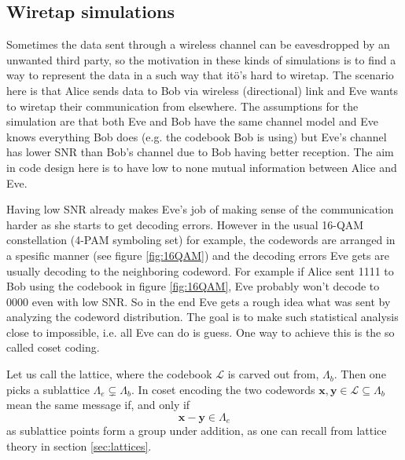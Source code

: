 \documentclass[english,12pt,a4paper,pdftex,sci,utf8]{aaltothesis}
\begin{document}
\subsection{Wiretap simulations}
\label{sec:wiretap}
Sometimes the data sent through a wireless channel can be eavesdropped by an unwanted third party, so the motivation in these kinds of simulations is to find a way to represent the data in a such way that itö's hard to wiretap. The scenario here is that Alice sends data to Bob via wireless (directional) link and Eve wants to wiretap their communication from elsewhere. The assumptions for the simulation are that both Eve and Bob have the same channel model and Eve knows everything Bob does (e.g. the codebook Bob is using) but Eve's channel has lower SNR than Bob's channel due to Bob having better reception. The aim in code design here is to have low to none mutual information between Alice and Eve. 
\par Having low SNR already makes Eve's job of making sense of the communication harder as she starts to get decoding errors. However in the usual 16-QAM constellation (4-PAM symboling set) for example, the codewords are arranged in a spesific manner (see figure \ref{fig:16QAM}) and the decoding errors Eve gets are usually decoding to the neighboring codeword. For example if Alice sent 1111 to Bob using the codebook in figure \ref{fig:16QAM}, Eve probably won't decode to 0000 even with low SNR. So in the end Eve gets a rough idea what was sent by analyzing the codeword distribution. The goal is to make such statistical analysis close to impossible, i.e. all Eve can do is guess. One way to achieve this is the so called coset coding. 
\par Let us call the lattice, where the codebook $\mathcal{L}$ is carved out from, $\Lambda_b$. Then one picks a sublattice $\Lambda_e \subsetneq \Lambda_b$. In coset encoding the two codewords $\mathbf{x, y} \in \mathcal{L} \subseteq \Lambda_b$ mean the same message if, and only if
\begin{equation}
\mathbf{x - y} \in \Lambda_e
\end{equation}
as sublattice points form a group under addition, as one can recall from lattice theory in section \ref{sec:lattices}. 
\end{document}
